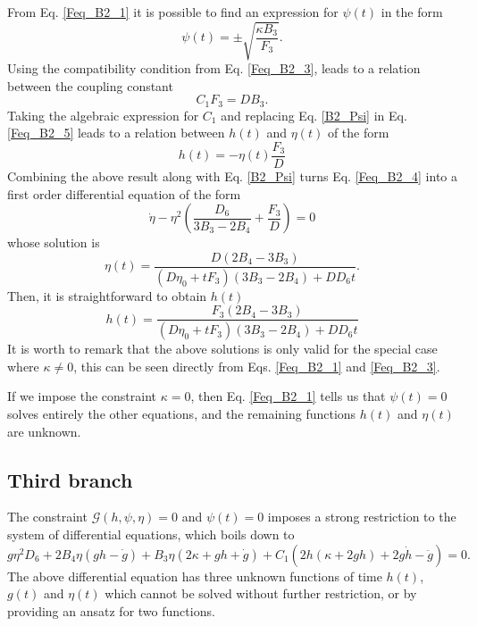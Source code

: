 From Eq. \eqref{Feq_B2_1} it is possible to find an expression for $\psi(t)$ in the form
\begin{equation}
	\label{B2_Psi}
    \psi(t) = \pm \sqrt{\frac{\kappa B_3}{F_3}} .
\end{equation}
Using the compatibility condition from Eq. \eqref{Feq_B2_3}, leads to a relation between
the coupling constant
\begin{equation}
 C_1 F_3 = D B_3.
\end{equation}
Taking the algebraic expression for $C_1$ and replacing Eq. \eqref{B2_Psi} in Eq.\eqref{Feq_B2_5} leads to a relation between $h(t)$ and $\eta(t)$ of the form
\begin{equation}
    h(t) = - \eta(t)\frac{F_3}{D}
\end{equation}
Combining the above result along with Eq. \eqref{B2_Psi} turns Eq. \eqref{Feq_B2_4} into a first order differential equation of the form
\begin{equation}
 \dot{\eta} - \eta^2\left(\frac{D_6}{3B_3 - 2B_4} + \frac{F_3}{D}\right) = 0
\end{equation}
whose solution is
\begin{equation}
    \eta(t) = \frac{D\left(2B_4 - 3B_3\right)}{\left(D \eta_0 + tF_3\right)\left(3B_3 - 2B_4\right) + DD_6 t}.
\end{equation}
Then, it is straightforward to obtain $h(t)$ 
\begin{equation}
    h(t) = \frac{F_3\left(2B_4 - 3B_3\right)}{\left(D \eta_0 + tF_3\right)\left(3B_3 - 2B_4\right) + DD_6 t}
\end{equation}
It is worth to remark that the above solutions is only valid for the special case 
where $\kappa \neq 0$, this can be seen directly from Eqs. \eqref{Feq_B2_1} and \eqref{Feq_B2_3}.

If we impose the constraint $\kappa = 0$, then Eq. \eqref{Feq_B2_1} tells us that $\psi(t) = 0$ solves entirely the other
equations, and the remaining functions $h(t)$ and $\eta(t)$ are unknown.

\subsection{Third branch}

The constraint $\mathcal{G}(h,\psi,\eta) = 0$ and $\psi(t)=0$ imposes a strong restriction to the system of differential equations, which boils down to 
\begin{dmath}
    g\eta^2D_6 + 2B_4\eta \left(gh - \dot{g}\right) + B_3\eta\left(2\kappa + gh + \dot{g}\right) + 
    C_1\left(2h\left(\kappa + 2gh\right) + 2g\dot{h} - \ddot{g}\right) = 0.
\end{dmath}
The above differential equation has three unknown functions of time $h(t)$, $g(t)$ and $\eta(t)$ which cannot be solved without 
further restriction, or by providing an ansatz for two functions.

